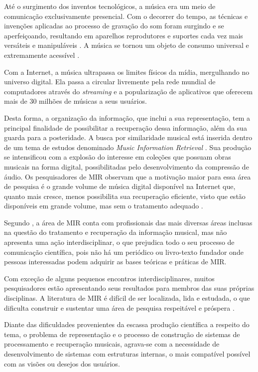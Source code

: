 Até o surgimento dos inventos tecnológicos, a música era um meio de comunicação exclusivamente presencial. Com o decorrer do tempo, as técnicas e invenções aplicadas ao processo de gravação do som foram surgindo e se aperfeiçoando, resultando em aparelhos reprodutores e suportes cada vez mais versáteis e manipuláveis \cite{daquino2012}. A música se tornou um objeto de consumo universal e extremamente acessível \cite{gomes2015}.

Com a Internet, a música ultrapassa os limites físicos da mídia, mergulhando no universo digital. Ela passa a circular livremente pela rede mundial de computadores através do \textit{streaming} \cite{junior&segundo2008} e a popularização de aplicativos que oferecem mais de 30 milhões de músicas a seus usuários.

Desta forma, a organização da informação, que inclui a sua representação, tem a principal finalidade de possibilitar a recuperação dessa informação, além da sua guarda para a posteridade. A busca por similaridade musical está inserida dentro de um tema de estudos denominado \textit{Music Information Retrieval} \cite{mclane1996}. Sua produção se intensificou com a explosão do interesse em coleções que possuam obras musicais na forma digital, possibilitadas pelo desenvolvimento da compressão de áudio. Os pesquisadores de MIR observam que a motivação maior para essa área de pesquisa é o grande volume de música digital disponível na Internet que, quanto mais cresce, menos possibilita sua recuperação eficiente, visto que estão disponíveis em grande volume, mas sem o tratamento adequado \cite{gomes2015}.

Segundo , a área de MIR conta com profissionais das mais diversas áreas inclusas na questão do tratamento e recuperação da informação musical, mas não apresenta uma ação interdisciplinar, o que prejudica todo o seu processo de comunicação científica, pois não há um periódico ou livro-texto fundador onde pessoas interessadas podem adquirir as bases teóricas e práticas de MIR. 

Com exceção de alguns pequenos encontros interdisciplinares, muitos pesquisadores estão apresentando seus resultados para membros das suas próprias disciplinas. A literatura de MIR é difícil de ser localizada, lida e estudada, o que dificulta construir e sustentar uma área de pesquisa respeitável e próspera \cite{santini&souza2007}.

Diante das dificuldades provenientes da escassa produção científica a respeito do tema, o problema de representação e o processo de construção de sistemas de processamento e recuperação musicais, agrava-se com a necessidade de desenvolvimento de sistemas com estruturas internas, o mais compatível possível com as visões ou desejos dos usuários.

